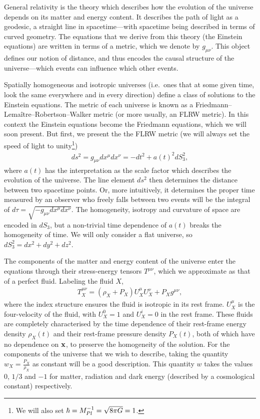     General relativity is the theory which describes how the evolution of the universe depends
    on its matter and energy content. It describes the path of light as a geodesic, a straight line
    in spacetime---with spacetime being described in terms of curved geometry.
    The equations that we derive from this theory (the Einstein equations) are written in terms of a metric,
    which we denote by $g_{\mu\nu}$. This object defines our notion of distance, and thus encodes
    the causal structure of the universe---which events can influence which other events.
    

    Spatially homogeneous and isotropic universes (i.e.\ ones that at some given
    time, look the same everywhere and in every direction)
    define a class of solutions to the Einstein equations.
    The metric of each universe is known as a Friedmann–Lemaître–Robertson–Walker metric
    (or more usually, an FLRW metric). In this context
    the Einstein equations become the Friedmann equations, which we will soon present.
    But first, we present the the FLRW metric (we will always set the speed of light to unity\footnote{
        We will also set $\hbar=M_{Pl}^{-1}=\sqrt{8\pi G}=1$.
    })
    \begin{align}\label{flrw_metric}
        ds^2 = g_{\mu\nu}dx^{\mu}dx^{\nu} = - dt^2 + a(t)^2 dS_3^2,
    \end{align}
    where $a(t)$ has the interpretation as the scale factor
    which describes the evolution of the universe.
    The line element $ds^2$ then determines the distance between two spacetime points.
    Or, more intuitively, it determines the proper time measured by an observer who freely falls
    between two events will be the integral of $d\tau=\sqrt{-g_{\mu\nu}dx^\mu dx^\nu}$.
    The homogeneity, isotropy and curvature of space are encoded in $dS_3$,
    but a non-trivial time dependence of $a(t)$ breaks the homogeneity of time.
    We will only consider a flat universe, so $dS_3^2=dx^2+dy^2+dz^2$.


    The components of the matter and energy content of the universe enter the equations through
    their stress-energy tensors $T^{\mu\nu}$, which we approximate as that of
    a perfect fluid. Labeling the fluid $X$,
    \begin{align}
        T_X^{\mu\nu} = (\rho_X+P_X)U_X^\mu U_X^\nu+P_Xg^{\mu\nu},
    \end{align}
    where the index structure ensures the fluid is isotropic in its rest frame.
    $U_X^\mu$ is the four-velocity of the fluid, with $U_X^0=1$ and $U_X^i=0$
    in the rest frame.
    These fluids are completely characterised by the time dependence
    of their rest-frame energy density $\rho_X(t)$ and their rest-frame
    pressure density $P_X(t)$,
    both of which have no dependence on $\mathbf{x}$, to preserve the homogeneity of the solution.
    For the components of the universe that we wish to describe,
    taking the quantity $w_X=\frac{P_X}{\rho_X}$ as constant will be a good description.
    This quantity $w$ takes the values $0$, $1/3$ and $-1$ for matter, radiation
    and dark energy (described by a cosmological constant) respectively.


